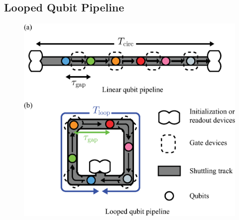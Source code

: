 \documentclass[a4paper,11pt]{ltjsarticle}
\begin{document}
{    \subsection{Looped Qubit Pipeline}{
        \begin{figure}[h]
            \centering
            \includegraphics[scale=0.50]{figure/shuttling_track.eps}
            \vspace{0pt}\caption{}
            \label{shuttling_truck}
        \end{figure}

}}
\end{document}

